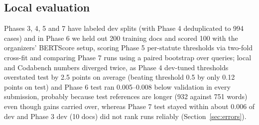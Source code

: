 \documentclass[11pt, oneside]{article}
\begin{document}
\begin{table}[H]
\centering\footnotesize
\setlength{\tabcolsep}{3pt}
\caption{Hyperparameters of the final model in each phase. LR: backbone / adapter / head.}
\label{tab:hparams}
\end{table}

\subsection{Local evaluation}
Phases 3, 4, 5 and 7 have labeled dev splits (with Phase 4 deduplicated to 994 cases) and in Phase 6 we held out 200 training docs and scored 100 with the organizers' BERTScore setup, scoring Phase 5 per-statute thresholds via two-fold cross-fit and comparing Phase 7 runs using a paired bootstrap over queries; local and Codabench numbers diverged twice, as Phase 4 dev-tuned thresholds overstated test by 2.5 points on average (beating threshold 0.5 by only 0.12 points on test) and Phase 6 test ran 0.005--0.008 below validation in every submission, probably because test references are longer (932 against 751 words) even though gains carried over, whereas Phase 7 test stayed within about 0.006 of dev and Phase 3 dev (10 docs) did not rank runs reliably (Section~\ref{sec:errors}).
\end{document}
